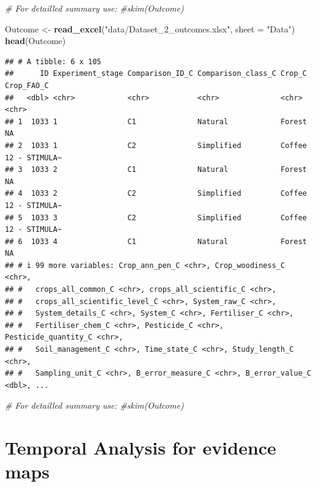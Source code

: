 \documentclass[
]{book}
\newenvironment{Shaded}{\begin{snugshade}}{\end{snugshade}}
\newcommand{\AttributeTok}[1]{\textcolor[rgb]{0.13,0.29,0.53}{#1}}
\newcommand{\CommentTok}[1]{\textcolor[rgb]{0.56,0.35,0.01}{\textit{#1}}}
\newcommand{\FunctionTok}[1]{\textcolor[rgb]{0.13,0.29,0.53}{\textbf{#1}}}
\newcommand{\NormalTok}[1]{#1}
\newcommand{\OtherTok}[1]{\textcolor[rgb]{0.56,0.35,0.01}{#1}}
\newcommand{\StringTok}[1]{\textcolor[rgb]{0.31,0.60,0.02}{#1}}
\begin{document}
\begin{Shaded}
\begin{Highlighting}[]
\CommentTok{\# For detailled summary use:}
\CommentTok{\#skim(Outcome)}

\NormalTok{Outcome }\OtherTok{\textless{}{-}} \FunctionTok{read\_excel}\NormalTok{(}\StringTok{"data/Dataset\_2\_outcomes.xlsx"}\NormalTok{, }\AttributeTok{sheet =} \StringTok{"Data"}\NormalTok{)}
\FunctionTok{head}\NormalTok{(Outcome)}
\end{Highlighting}
\end{Shaded}

\begin{verbatim}
## # A tibble: 6 x 105
##      ID Experiment_stage Comparison_ID_C Comparison_class_C Crop_C Crop_FAO_C   
##   <dbl> <chr>            <chr>           <chr>              <chr>  <chr>        
## 1  1033 1                C1              Natural            Forest NA           
## 2  1033 1                C2              Simplified         Coffee 12 - STIMULA~
## 3  1033 2                C1              Natural            Forest NA           
## 4  1033 2                C2              Simplified         Coffee 12 - STIMULA~
## 5  1033 3                C2              Simplified         Coffee 12 - STIMULA~
## 6  1033 4                C1              Natural            Forest NA           
## # i 99 more variables: Crop_ann_pen_C <chr>, Crop_woodiness_C <chr>,
## #   crops_all_common_C <chr>, crops_all_scientific_C <chr>,
## #   crops_all_scientific_level_C <chr>, System_raw_C <chr>,
## #   System_details_C <chr>, System_C <chr>, Fertiliser_C <chr>,
## #   Fertiliser_chem_C <chr>, Pesticide_C <chr>, Pesticide_quantity_C <chr>,
## #   Soil_management_C <chr>, Time_state_C <chr>, Study_length_C <chr>,
## #   Sampling_unit_C <chr>, B_error_measure_C <chr>, B_error_value_C <dbl>, ...
\end{verbatim}

\begin{Shaded}
\begin{Highlighting}[]
\CommentTok{\# For detailled summary use:}
\CommentTok{\#skim(Outcome)}
\end{Highlighting}
\end{Shaded}

\chapter{Temporal Analysis for evidence maps}\label{temporal-analysis-for-evidence-maps}
\end{document}
